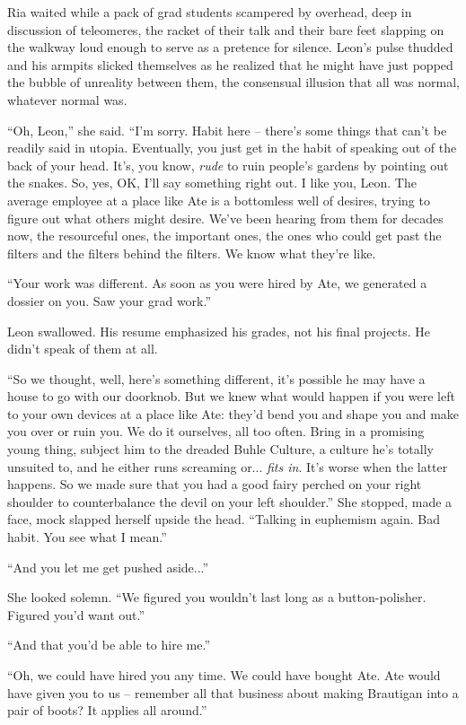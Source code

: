 Ria waited while a pack of grad students scampered by overhead, deep in 
discussion of teleomeres, the racket of their talk and their bare feet 
slapping on the walkway loud enough to serve as a pretence for silence. 
Leon's pulse thudded and his armpits slicked themselves as he realized 
that he might have just popped the bubble of unreality between them, 
the consensual illusion that all was normal, whatever normal was.

“Oh, Leon,” she said. “I'm sorry. Habit here -- there's some 
things that can't be readily said in utopia. Eventually, you just get 
in the habit of speaking out of the back of your head. It's, you know, 
\emph{rude} to ruin people's gardens by pointing out the snakes. So, 
yes, OK, I'll say something right out. I like you, Leon. The average 
employee at a place like Ate is a bottomless well of desires, trying to 
figure out what others might desire. We've been hearing from them for 
decades now, the resourceful ones, the important ones, the ones who 
could get past the filters and the filters behind the filters. We know 
what they're like.

“Your work was different. As soon as you were hired by Ate, we 
generated a dossier on you. Saw your grad work.”

Leon swallowed. His resume emphasized his grades, not his final 
projects. He didn't speak of them at all.

“So we thought, well, here's something different, it's possible he 
may have a house to go with our doorknob. But we knew what would happen 
if you were left to your own devices at a place like Ate: they'd bend 
you and shape you and make you over or ruin you. We do it ourselves, 
all too often. Bring in a promising young thing, subject him to the 
dreaded Buhle Culture, a culture he's totally unsuited to, and he 
either runs screaming or... \emph{fits in}. It's worse when the latter 
happens. So we made sure that you had a good fairy perched on your 
right shoulder to counterbalance the devil on your left shoulder.” 
She stopped, made a face, mock slapped herself upside the head. 
“Talking in euphemism again. Bad habit. You see what I mean.”

“And you let me get pushed aside...”

She looked solemn. “We figured you wouldn't last long as a 
button-polisher. Figured you'd want out.”

“And that you'd be able to hire me.”

“Oh, we could have hired you any time. We could have bought Ate. Ate 
would have given you to us -- remember all that business about making 
Brautigan into a pair of boots? It applies all around.”

